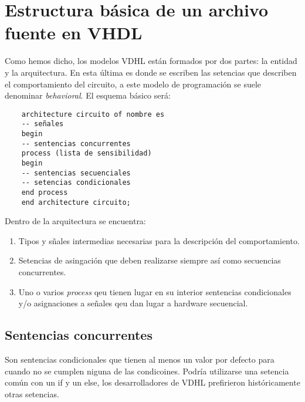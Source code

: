 \section{Estructura básica de un archivo fuente en VHDL}

Como hemos dicho, los modelos VDHL están formados por dos partes: la entidad y la arquitectura. En esta última es donde se escriben las setencias que describen el comportamiento del circuito, a este modelo de programación se suele denominar \textit{behavioral}. El esquema básico será: 

\begin{lstlisting}
    architecture circuito of nombre es 
    -- señales
    begin 
    -- sentencias concurrentes
    process (lista de sensibilidad)
    begin 
    -- sentencias secuenciales
    -- setencias condicionales
    end process
    end architecture circuito; 
\end{lstlisting}
Dentro de la arquitectura se encuentra: 
\begin{enumerate}
    \item Tipos y sñales intermedias necesarias para la descripción del comportamiento. 
    \item Setencias de asingación que deben realizarse siempre así como secuencias concurrentes.
    \item Uno o varios \textit{process} qeu tienen lugar en su interior sentencias condicionales y/o asignaciones a señales qeu dan lugar a hardware secuencial. 
\end{enumerate}

\subsection{Sentencias concurrentes}

Son sentencias condicionales que tienen al menos un valor por defecto para cuando no se cumplen niguna de las condicoines. Podría utilizarse una setencia común con un if y un else, los desarrolladores de VDHL prefirieron históricamente otras setencias.

